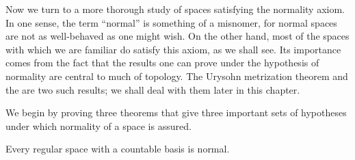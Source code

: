 Now we turn to a more thorough study of spaces satisfying the normality axiom. In one sense, the term ``normal'' is something of a misnomer, for normal spaces are not as well-behaved as one might wish. On the other hand, most of the spaces with which we are familiar do satisfy this axiom, as we shall see. Its importance comes from the fact that the results one can prove under the hypothesis of normality are central to much of topology. The Urysohn metrization theorem and the  are two such results; we shall deal with them later in this chapter.

We begin by proving three theorems that give three important sets of hypotheses under which normality of a space is assured.

\begin{theorem}
\label{thm:\thetheorem}
 Every regular space with a countable basis is normal.

\end{theorem}


